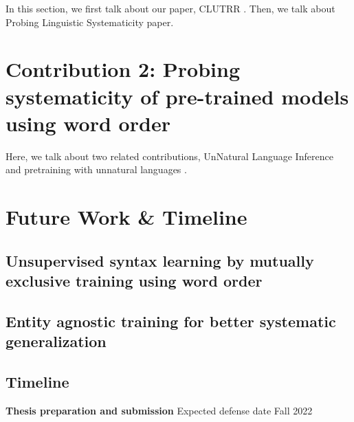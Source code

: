 \documentclass[12pt]{article}
\begin{document}

In this section, we first talk about our paper, CLUTRR \cite{sinha2019a}. Then, we talk about Probing Linguistic Systematicity \cite{goodwin2020} paper.


\section{Contribution 2: Probing systematicity of pre-trained models using word order}


Here, we talk about two related contributions, UnNatural Language Inference \cite{sinha2021} and pretraining with unnatural languages \cite{sinha2021a}.



\section{Future Work \& Timeline}

\subsection{Unsupervised syntax learning by mutually exclusive training using word order}

\subsection{Entity agnostic training for better systematic generalization}

\subsection{Timeline}

\noindent \textbf{Thesis preparation and submission} Expected defense date Fall 2022



\end{document}
